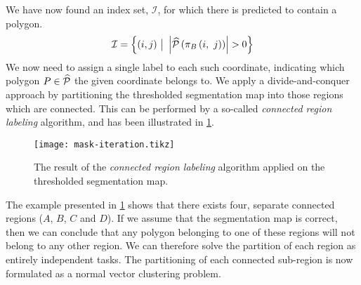 \noindent
We have now found an index set, $\mathcal{I}$, for which there is predicted to contain a polygon.
\begin{equation*}
  \mathcal{I}
  =
  \left\{
  (i, j)
  ~\big{|}~
  \left|\widehat{\mathcal{P}}\left(\pi_{B}\left(i,~j\right)\right)\right| > 0
  \right\}
\end{equation*}
We now need to assign a single label to each such coordinate, indicating which polygon $P \in \widehat{\mathcal{P}}$ the given coordinate belongs to.
We apply a divide-and-conquer approach by partitioning the thresholded segmentation map into those regions which are connected.
This can be performed by a so-called \textit{connected region labeling} algorithm, and has been illustrated in \cref{fig:mask-iteration}.
\begin{figure}[H]
  \centering
  \texttt{[image: mask-iteration.tikz]}
  \caption{The result of the  \textit{connected region labeling} algorithm applied on the thresholded segmentation map.}%
  \label{fig:mask-iteration}
\end{figure}
\noindent
The example presented in \cref{fig:mask-iteration} shows that there exists four, separate connected regions ($A$, $B$, $C$ and $D$).
If we assume that the segmentation map is correct, then we can conclude that any polygon belonging to one of these regions will not belong to any other region.
We can therefore solve the partition of each region as entirely independent tasks.
The partitioning of each connected sub-region is now formulated as a normal vector clustering problem.
